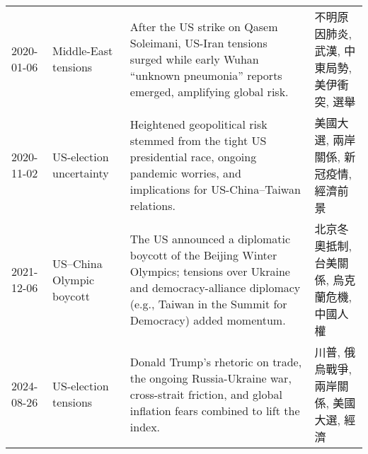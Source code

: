 \begin{table}[htbp]
\begin{tabularx}{\textwidth}{@{}L{2.4cm}L{3.1cm}X L{3.5cm}@{}}
2020-01-06 & Middle-East tensions &
After the US strike on Qasem Soleimani, US-Iran tensions surged while early Wuhan “unknown pneumonia” reports emerged, amplifying global risk. &
不明原因肺炎, 武漢, 中東局勢, 美伊衝突, 選舉\\[4pt]

2020-11-02 & US-election uncertainty &
Heightened geopolitical risk stemmed from the tight US presidential race, ongoing pandemic worries, and implications for US-China–Taiwan relations. &
美國大選, 兩岸關係, 新冠疫情, 經濟前景\\[4pt]

2021-12-06 & US–China Olympic boycott &
The US announced a diplomatic boycott of the Beijing Winter Olympics; tensions over Ukraine and democracy-alliance diplomacy (e.g., Taiwan in the Summit for Democracy) added momentum. &
北京冬奧抵制, 台美關係, 烏克蘭危機, 中國人權\\[4pt]

2024-08-26 & US-election tensions &
Donald Trump’s rhetoric on trade, the ongoing Russia-Ukraine war, cross-strait friction, and global inflation fears combined to lift the index. &
川普, 俄烏戰爭, 兩岸關係, 美國大選, 經濟\\
\bottomrule
\end{tabularx}
\end{table}
